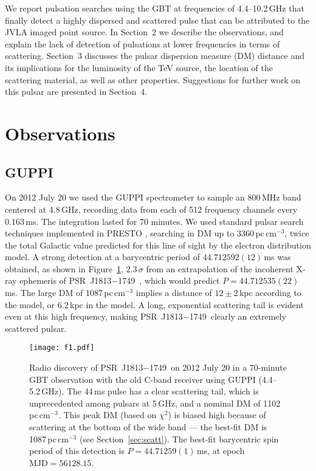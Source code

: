 \documentclass[twocolumn]{aastex62}
\newcommand\psr{PSR~J1813$-$1749}
\begin{document}
We report pulsation searches using the GBT at frequencies of
4.4--10.2\,GHz that finally detect a highly dispersed and scattered
pulse that can be attributed to the JVLA imaged point source.  In
Section~2 we describe the observations, and explain the lack of
detection of pulsations at lower frequencies in terms of scattering.
Section~3 discusses the pulsar dispersion measure (DM) distance and
its implications for the luminosity of the TeV source, the location
of the scattering material, as well as other properties.  Suggestions
for further work on this pulsar are presented in Section~4.


\section{Observations}
\subsection{GUPPI}

On 2012 July 20 we used the GUPPI spectrometer \citep{drd+08} to
sample an 800\,MHz band centered at 4.8\,GHz, recording data from
each of 512 frequency channels every 0.163\,ms.  The integration
lasted for 70 minutes.  We used standard pulsar search techniques
implemented in PRESTO \citep{ran01}, searching in DM up to
3360\,pc\,cm$^{-3}$, twice the total Galactic value predicted for
this line of sight by the \citet{cor02} electron distribution model.
A strong detection at a barycentric period of $44.712592(12)$\,ms
was obtained, as shown in Figure~\ref{fig:fig1}, 2.3\,$\sigma$ from
an extrapolation of the incoherent X-ray ephemeris of \psr\
\citep{hal12}, which would predict $P=44.712535(22)$\,ms.  The large
DM of 1087\,pc\,cm$^{-3}$ implies a distance of $12\pm2$\,kpc
according to the \citet{cor02} model, or 6.2\,kpc in the \citet{yao17}
model.  A long, exponential scattering tail is evident even at this
high frequency, making \psr\ clearly an extremely scattered pulsar.

\begin{figure}
\centerline{
\texttt{[image: f1.pdf]}
}
\caption{Radio discovery of \psr\ on 2012 July 20 in a 70-minute
GBT observation with the old C-band receiver using GUPPI (4.4--5.2\,GHz).
The 44\,ms pulse has a clear scattering tail, which is unprecedented
among pulsars at 5\,GHz, and a nominal DM of 1102\,pc\,cm$^{-3}$.
This peak DM (based on $\chi^2$) is biased high because of scattering
at the bottom of the wide band --- the best-fit DM is 1087\,pc\,cm$^{-3}$
(see Section~\ref{sec:scatt}). The best-fit barycentric spin
period of this detection is $P=44.71259(1)$\,ms, at epoch $\mbox{MJD}
= 56128.15$.
} \label{fig:fig1} \end{figure}
\end{document}
